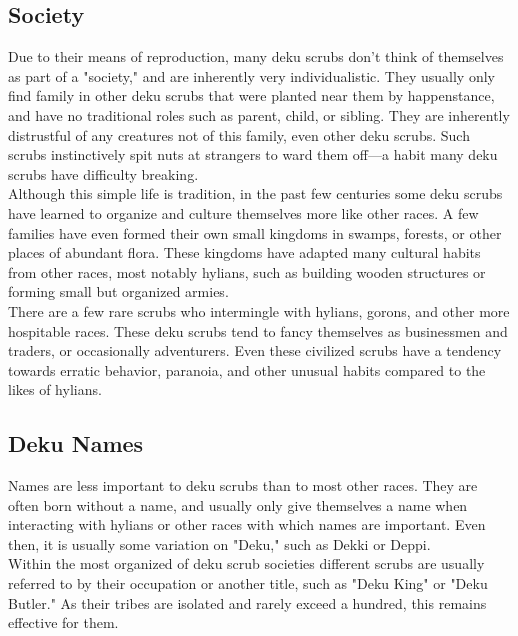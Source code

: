 \documentclass[10pt,twoside,twocolumn,openany]{book}
\begin{document}
\subsection{Society}
Due to their means of reproduction, many deku scrubs don't think of themselves as part of a "society," and are inherently very individualistic. They usually only find family in other deku scrubs that were planted near them by happenstance, and have no traditional roles such as parent, child, or sibling. They are inherently distrustful of any creatures not of this family, even other deku scrubs. Such scrubs instinctively spit nuts at strangers to ward them off—a habit many deku scrubs have difficulty breaking.\\
Although this simple life is tradition, in the past few centuries some deku scrubs have learned to organize and culture themselves more like other races. A few families have even formed their own small kingdoms in swamps, forests, or other places of abundant flora. These kingdoms have adapted many cultural habits from other races, most notably hylians, such as building wooden structures or forming small but organized armies.\\
There are a few rare scrubs who intermingle with hylians, gorons, and other more hospitable races. These deku scrubs tend to fancy themselves as businessmen and traders, or occasionally adventurers. Even these civilized scrubs have a tendency towards erratic behavior, paranoia, and other unusual habits compared to the likes of hylians.

\subsection{Deku Names}
Names are less important to deku scrubs than to most other races. They are often born without a name, and usually only give themselves a name when interacting with hylians or other races with which names are important. Even then, it is usually some variation on "Deku," such as Dekki or Deppi.\\
Within the most organized of deku scrub societies different scrubs are usually referred to by their occupation or another title, such as "Deku King" or "Deku Butler." As their tribes are isolated and rarely exceed a hundred, this remains effective for them.
\end{document}
